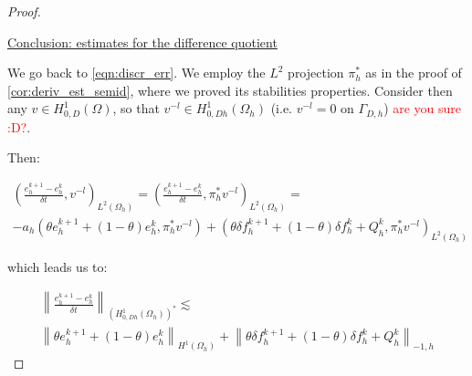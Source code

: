 \documentclass[english,a4paper,10pt,oneside]{scrbook}	%
\theoremstyle{break}
\newenvironment{mproof}[1][\proofname]{%
  \begin{proof}[#1]$ $\par\nobreak\ignorespaces
}{%
  \end{proof}
}
\renewcommand*{\proofname}{Proof}
\theoremstyle{remark}
\newcommand{\norm}[1]{\left\lVert#1\right\rVert}
\begin{document}
\begin{mproof}
%
%
%
%
%
%
%

\underline{Conclusion: estimates for the difference quotient}

We go back to \cref{eqn:discr_err}.  We employ the $L^2$ projection $\pi_h^*$ as in the proof of \cref{cor:deriv_est_semid}, where we proved its stabilities properties. Consider then any $v \in H^1_{0,D}(\Omega)$, so that $v^{-l} \in H^1_{0,Dh}(\Omega_h)$ (i.e. $v^{-l}=0$ on $\Gamma_{D,h}$) \textcolor{red}{are you sure :D?}.

Then:

\begin{align}
\label{eqn:der_err_eqn}
\left ( \frac{e_{h}^{k+1}-e_h^k}{\delta t}, v^{-l}\right)_{L^2(\Omega_h)} = \left ( \frac{e_{h}^{k+1}-e_h^k}{\delta t}, \pi_h^* v^{-l}\right)_{L^2(\Omega_h)} =  \\- a_h(\theta e_h^{k+1}+(1-\theta)e^k_h, \pi_h^* v^{-l}) + (\theta \delta f_h^{k+1}+(1-\theta)\delta f_h^k + Q_h^k, \pi_h^* v^{-l})_{L^2(\Omega_h)}
\end{align}

which leads us to:

\begin{align*}
\norm{ \frac{e_{h}^{k+1}-e_h^k}{\delta t}}_{(H^1_{0,Dh}(\Omega_h))^*} \lesssim  \\\norm{\theta e_h^{k+1}+(1-\theta)e^k_h}_{H^1(\Omega_h)} + \norm{\theta \delta f_h^{k+1}+(1-\theta)\delta f_h^k + Q_h^k}_{-1,h}
\end{align*}


\end{mproof}
\end{document}
